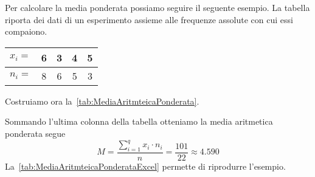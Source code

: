 Per calcolare la media ponderata possiamo seguire il seguente esempio. La tabella riporta dei dati di un esperimento assieme alle frequenze assolute con cui essi compaiono. 
\begin{center}
\begin{tabular}{l*{4} {S[table-format=1.0]}}
	{$x_{i}=$}	&6  &3  &4  &5  \\
	\midrule 
	{$n_{i}=$}	& 8 &6  & 5 & 3 \\ 
\end{tabular}
\end{center}
Costruiamo ora  la~\vref{tab:MediaAritmteicaPonderata}.

Sommando l'ultima colonna della tabella otteniamo la media aritmetica ponderata segue 
\[M=\dfrac{\sum_{i=1}^{q}x_{i}\cdot n_{i}}{n}=\dfrac{\num{101}}{\num{22}} \approx\num{4.590} \]
La~\vref{tab:MediaAritmteicaPonderataExcel} permette di riprodurre l'esempio.

